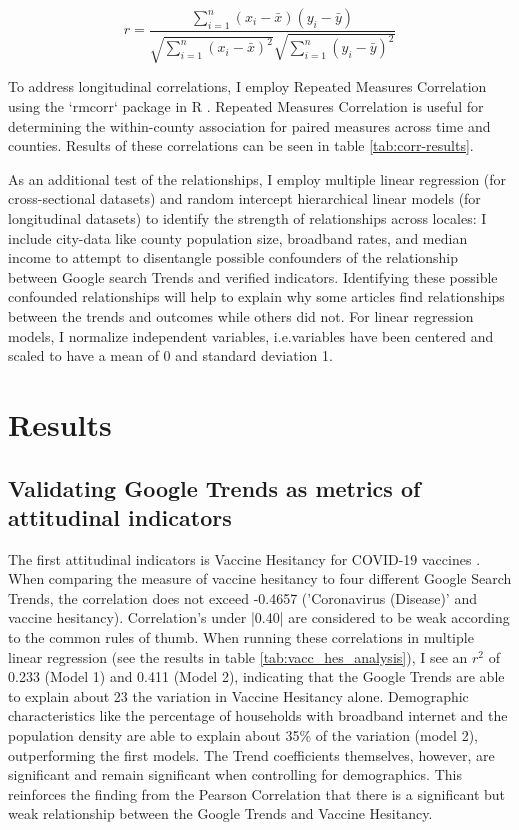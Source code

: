 \begin{equation}
 r =
  \frac{ \sum_{i=1}^{n}(x_i-\bar{x})(y_i-\bar{y}) }{
        \sqrt{\sum_{i=1}^{n}(x_i-\bar{x})^2}\sqrt{\sum_{i=1}^{n}(y_i-\bar{y})^2}} \label{eq:pearsoncorr}
\end{equation}

To address longitudinal correlations, I employ Repeated Measures Correlation
using the `rmcorr` package in R \citep{bland1995, bakdash2017}. Repeated Measures
Correlation is useful for determining the within-county association for paired
measures across time and counties. Results of these correlations can be seen in 
table \ref{tab:corr-results}.

As an additional test of the relationships, I employ multiple linear regression
(for cross-sectional datasets) and random intercept hierarchical linear models
\citep{pinheiro_etal21} (for longitudinal datasets) to identify the strength of
relationships across locales: I include city-data like county population size,
broadband rates, and median income to attempt to disentangle possible
confounders of the relationship between Google search Trends and verified
indicators. Identifying these possible confounded relationships will help to
explain why some articles find relationships between the trends and outcomes
while others did not. For linear regression models, I normalize independent
variables, i.e.variables have been centered and scaled to have a mean of 0 and
standard deviation 1.

\section{Results}

\subsection{Validating Google Trends as metrics of attitudinal indicators}




The first attitudinal indicators is Vaccine Hesitancy for COVID-19 vaccines
\citep{vaches_data}. When comparing the measure of vaccine hesitancy to four
different Google Search Trends, the correlation does not exceed -0.4657
('Coronavirus (Disease)' and vaccine hesitancy). Correlation's under |0.40| are
considered to be weak according to the common rules of thumb. When running these
correlations in multiple linear regression (see the results in table
\ref{tab:vacc_hes_analysis}), I see an $r^2$ of 0.233 (Model 1) and 0.411
(Model 2), indicating that the Google Trends are able to explain about 23%
the variation in Vaccine Hesitancy alone. Demographic characteristics like the
percentage of households with broadband internet and the population density are
able to explain about 35\% of the variation (model 2), outperforming the first
models. The Trend coefficients themselves, however, are significant and remain
significant when controlling for demographics. This reinforces the finding from
the Pearson Correlation that there is a significant but weak relationship
between the Google Trends and Vaccine Hesitancy.

